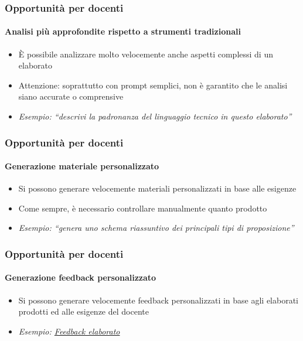 \begin{contentframe}
    \frametitle{Opportunità per docenti}
    \framesubtitle{Analisi più approfondite rispetto a strumenti tradizionali}

    \begin{itemize}
        \item È possibile analizzare molto velocemente anche aspetti complessi di un elaborato

        \bigskip
        \item Attenzione: soprattutto con prompt semplici, non è garantito che le analisi siano accurate o comprensive

        \bigskip
        \item \textit{Esempio: ``descrivi la padronanza del linguaggio tecnico in questo elaborato''}
    \end{itemize}
\end{contentframe}

\begin{contentframe}
    \frametitle{Opportunità per docenti}
    \framesubtitle{Generazione materiale personalizzato}

    \begin{itemize}
        \item Si possono generare velocemente materiali personalizzati in base alle esigenze
        \item Come sempre, è necessario controllare manualmente quanto prodotto

        \bigskip
        \item \textit{Esempio: ``genera uno schema riassuntivo dei principali tipi di proposizione''} 
    \end{itemize}
\end{contentframe}

\begin{contentframe}
    \frametitle{Opportunità per docenti}
    \framesubtitle{Generazione feedback personalizzato}

    \begin{itemize}
        \item Si possono generare velocemente feedback personalizzati in base agli elaborati prodotti ed alle esigenze del docente

        \bigskip
        \item \textit{Esempio: \href{https://chatgpt.com/share/6776a77f-8288-8003-86ad-95b7b556fcf6}{Feedback elaborato}}
    \end{itemize}
\end{contentframe}

